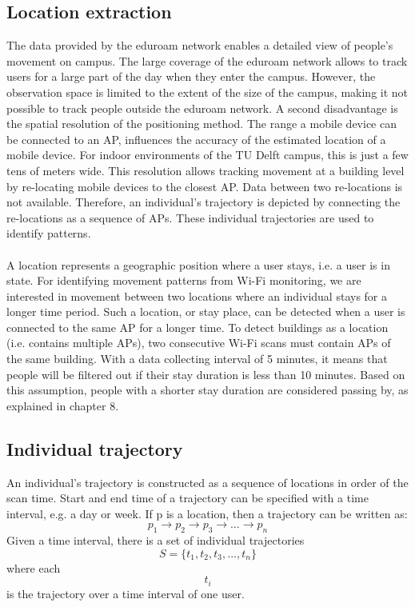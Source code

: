 \subsection{Location extraction}
The data provided by the eduroam network enables a detailed view of people’s movement on campus. The large coverage of the eduroam network allows to track users for a large part of the day when they enter the campus. However, the observation space is limited to the extent of the size of the campus, making it not possible to track people outside the eduroam network. A second disadvantage is the spatial resolution of the positioning method. The range a mobile device can be connected to an AP,  influences the accuracy of the estimated location of a mobile device. For indoor environments of the TU Delft campus, this is just a few tens of meters wide. This resolution allows tracking movement at a building level by re-locating mobile devices to the closest AP. Data between two re-locations is not available. Therefore, an individual’s trajectory is depicted by connecting the re-locations as a sequence of APs. These individual trajectories are used to identify patterns. \\\\
A location represents a geographic position where a user stays, i.e. a user is in state. For identifying movement patterns from Wi-Fi monitoring, we are interested in movement between two locations where an individual stays for a longer time period. Such a location, or stay place, can be detected when a user is connected to the same AP for a longer time. To detect  buildings as a location (i.e. contains multiple APs), two consecutive Wi-Fi scans must contain  APs of the same building. With a data collecting interval of 5 minutes, it means that people will be filtered out if their stay duration is less than 10 minutes. Based on this assumption, people with a shorter stay duration are considered passing by, as explained in chapter 8.

\subsection{Individual trajectory}
An individual’s trajectory is constructed as a sequence of locations in order of the scan time. Start and end time of a trajectory can be specified with a time interval, e.g. a day or week. If p is a location, then a trajectory can be written as:
$$p_{1} \rightarrow p_{2} \rightarrow p_{3} \rightarrow …\rightarrow p_{n}$$
Given a time interval, there is a set of individual trajectories $$\textit{S} = \{t_{1}, t_{2}, t_{3},...,t_{n}\}$$ where each $$t_{i}$$ is the trajectory over a time interval of one user. 

